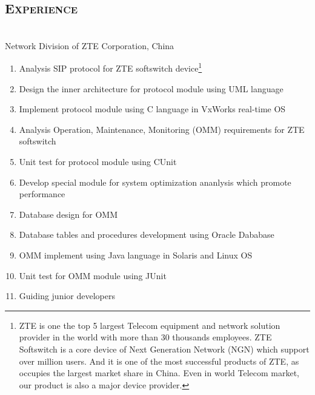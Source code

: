 \documentclass[margin,11pt]{res}
\begin{document}
\begin{resume}
\section{\textsc{Experience}} 
 \\
Network Division of ZTE Corporation, China

    \begin{enumerate}\itemsep -2pt %
    \item Analysis SIP protocol for ZTE softswitch device\footnote{ZTE is
        one the top 5 largest Telecom equipment and network solution provider in the world
        with more than 30 thousands employees. ZTE Softswitch is a core device of Next
        Generation Network (NGN) which support over million users. And it is one of the
        most successful products of ZTE, as occupies the largest market share in China.
        Even in world Telecom market, our product is also a major device provider.}
    \item Design the inner architecture for protocol module using UML language
    \item Implement protocol module using C language in VxWorks real-time OS
    \item Analysis Operation, Maintenance, Monitoring (OMM) requirements for ZTE softswitch
    \item Unit test for protocol module using CUnit
    \item Develop special module for system optimization ananlysis which promote performance
    \item Database design for OMM
    \item Database tables and procedures development using Oracle Dababase
    \item OMM implement using Java language in Solaris and Linux OS
    \item Unit test for OMM module using JUnit
    \item Guiding junior developers
    \end{enumerate}
 

\end{resume}
\end{document}
